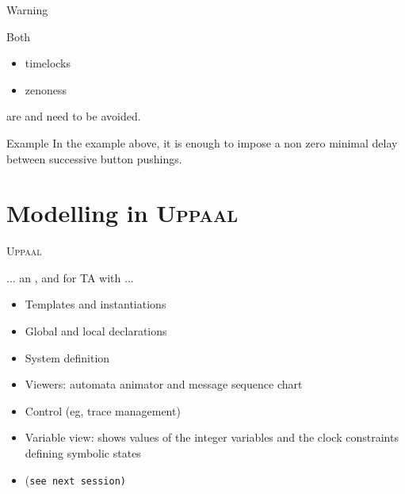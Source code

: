 \documentclass[aspectratio=169]{beamer}
\def\uppaal{\textsc{Uppaal}}
\begin{document}
\begin{slide}{Warning}
\small

Both 
\begin{itemize}
\item timelocks
\item zenoness
\end{itemize}
are  and need to be avoided.


\begin{block}{Example}
In the example above, it is enough to impose a non zero minimal delay  between successive button pushings.
\end{block}

\end{slide}




\section{Modelling in \uppaal}
\begin{slide}{\uppaal}
\small

... an ,   and  for TA with  ...

\vspace*{-3mm}
\begin{itemize}
\item \alert{Templates} and \alert{instantiations}
\item Global and local \alert{declarations}
\item \alert{System definition}
\end{itemize}

\vspace*{-3mm}
\begin{itemize}
\item Viewers: \alert{automata animator} and \alert{message sequence chart}
\item Control (eg, \alert{trace} management)
\item Variable view: shows values of the integer variables and the clock constraints defining symbolic states
\end{itemize}

\vspace*{-3mm}
\begin{itemize}
\item (\texttt{see next session)}
\end{itemize}

\end{slide}
\end{document}
